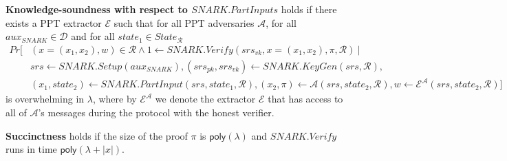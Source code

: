 \begin{dfn}
\noindent \textbf{Knowledge-soundness with respect to $\mathit{SNARK.PartInputs}$}
holds if there exists a PPT extractor $\mathcal{E}$ such that for all PPT 
adversaries $\mathcal{A}$, for all $\mathit{aux_{\mathit{SNARK}}} \in \mathcal{D}$ and for all $\mathit{state_1} \in \mathit{State_{\mathcal{R}}}$
\begin{align*}
\mathit{Pr}[&(x = (x_1, x_2), w) \in \mathcal{R} \wedge 1 \leftarrow \mathit{SNARK.Verify}(\mathit{srs_{vk}}, x = (x_1, x_2), \pi, \mathcal{R}) \ | \\
& \mathit{srs} \leftarrow \mathit{SNARK.Setup}(\mathit{aux_{\mathit{SNARK}}}), (\mathit{srs_{pk}}, \mathit{srs_{vk}})\leftarrow \mathit{SNARK.KeyGen}(\mathit{srs}, \mathcal{R}), \\ 
& (x_1, \mathit{state}_2) \leftarrow \mathit{SNARK.PartInput}(\mathit{srs}, \mathit{state}_1, \mathcal{R}), 
(x_2, \pi) \leftarrow \mathcal{A}(\mathit{srs}, \mathit{state}_2, \mathcal{R}),  
w \leftarrow \mathcal{E}^{\mathcal{A}}(srs,\mathit{state_2}, \mathcal{R})]
\end{align*}
is overwhelming in $\lambda$, where by $\mathcal{E}^{\mathcal{A}}$ we denote the extractor $\mathcal{E}$ that has access to all of 
$\mathcal{A}$'s messages during the protocol with the honest verifier. %


\noindent \textbf{Succinctness} holds if the size of the proof $\pi$ is $\mathsf{poly}(\lambda)$ and $\mathit{SNARK.Verify}$ runs in time 
$\mathsf{poly}(\lambda + |x|)$. %
\end{dfn}

